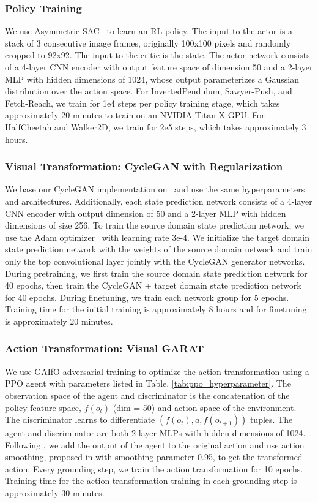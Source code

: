 \subsubsection{\textbf{Policy Training}}
We use Asymmetric SAC~\citep{pinto2017asymmetric} to learn an RL policy.  The input to the actor is a stack of 3 consecutive image frames, originally 100x100 pixels and randomly cropped to 92x92.  The input to the critic is the state.  The actor network consists of a 4-layer CNN encoder with output feature space of dimension 50 and a 2-layer MLP with hidden dimensions of 1024, whose output parameterizes a Gaussian distribution over the action space.  For InvertedPendulum, Sawyer-Push, and Fetch-Reach, we train for 1e4 steps per policy training stage, which takes approximately 20 minutes to train on an  NVIDIA Titan X GPU. For HalfCheetah and Walker2D, we train for 2e5 steps, which takes approximately 3 hours.

\subsubsection{\textbf{Visual Transformation: CycleGAN with Regularization}}
We base our CycleGAN implementation on~\citep{zhu2017unpaired} and use the same hyperparameters and architectures.  Additionally, each state prediction network consists of a 4-layer CNN encoder with output dimension of 50 and a 2-layer MLP with hidden dimensions of size 256.  To train the source domain state prediction network, we use the Adam optimizer~\citep{kingma2014adam} with learning rate 3e-4.  We initialize the target domain state prediction network with the weights of the source domain network and train only the top convolutional layer jointly with the CycleGAN generator networks.  During pretraining, we first train the source domain state prediction network for 40 epochs, then train the CycleGAN + target domain state prediction network for 40 epochs.  During finetuning, we train each network group for 5 epochs. Training time for the initial training is approximately 8 hours and for finetuning is approximately 20 minutes.

\subsubsection{\textbf{Action Transformation: Visual GARAT}}
We use GAIfO adversarial training to optimize the action transformation using a PPO agent with parameters listed in Table. \ref{tab:ppo_hyperparameter}.  The observation space of the agent and discriminator is the concatenation of the policy feature space, $f(o_t)$ (dim = 50) and action space of the environment.  The discriminator learns to differentiate $(f(o_t),a,f(o_{t+1}))$ tuples.  The agent and discriminator are both 2-layer MLPs with hidden dimensions of 1024.  Following \citet{desai2020imitation}, we add the output of the agent to the original action and use action smoothing, proposed in \citet{hanna2017grounded} with smoothing parameter 0.95, to get the transformed action.  Every grounding step, we train the action transformation for 10 epochs. Training time for the action transformation training in each grounding step is approximately 30 minutes.

